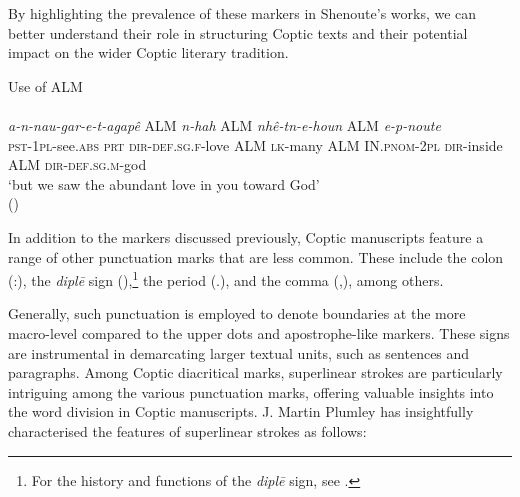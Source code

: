 \documentclass[output=paper,colorlinks,citecolor=brown ,chinesefont]{langscibook}
\begin{document}
By highlighting the prevalence of these markers in Shenoute's works, we can better understand their role in structuring Coptic texts and their potential impact on the wider Coptic literary tradition.

\begin{exe} 
\ex Use of ALM \\
\glll {}      	\\
\textit{a-n-nau-gar-e-t-agapê} ALM \textit{n-hah} ALM \textit{nhê-tn-e-houn} ALM \textit{e-p-noute} \\
\textsc{pst}-1\textsc{pl}-see.\textsc{abs} \textsc{prt} \textsc{dir}-\textsc{def}.\textsc{sg}.\textsc{f}-love ALM \textsc{lk}-many ALM IN.\textsc{pnom}-2\textsc{pl} \textsc{dir}-inside ALM \textsc{dir}-\textsc{def}.\textsc{sg}.\textsc{m}-god \\
\glt ‘but we saw the abundant love in you toward God' \\
\hspace*{\fill}()
\end{exe}

In addition to the markers discussed previously, Coptic manuscripts feature a range of other punctuation marks that are less common. These include the colon (:), the \textit{dipl\={e}} sign (),\footnote{For the history and functions of the \textit{dipl\=e} sign, see \citet[84--89]{miyagawa1}.}  the period (.), and the comma (,), among others. 


Generally, such punctuation is employed to denote boundaries at the more macro-level compared to the upper dots and apostrophe-like markers. These signs are instrumental in demarcating larger textual units, such as sentences and paragraphs.
Among Coptic diacritical marks, superlinear strokes are particularly intriguing among the various punctuation marks, offering valuable insights into the word division in Coptic manuscripts. J. Martin Plumley has insightfully characterised the features of superlinear strokes as follows:

\end{document}
